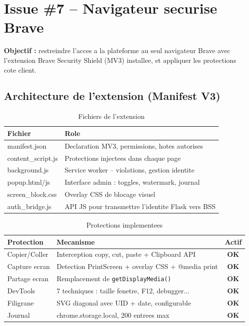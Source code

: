 \documentclass[12pt,a4paper]{article}
\newcommand{\ok}{\textcolor{green!60!black}{\textbf{OK}}}
\begin{document}
\section{Issue \#7 -- Navigateur securise Brave}

\noindent\colorbox{myblue!10}{\parbox{\linewidth}{\vspace{4pt}
\textbf{Objectif :} restreindre l'acces a la plateforme au seul navigateur Brave
avec l'extension Brave Security Shield (MV3) installee, et appliquer les
protections cote client.
\vspace{4pt}}}

\vspace{6pt}

\subsection{Architecture de l'extension (Manifest V3)}

\begin{table}[H]
\centering
\caption{Fichiers de l'extension}
\begin{tabularx}{\textwidth}{@{}>{\ttfamily}lX@{}}
\toprule
\normalfont Fichier & Role \\
\midrule
manifest.json      & Declaration MV3, permissions, hotes autorises \\
content\_script.js & Protections injectees dans chaque page \\
background.js      & Service worker -- violations, gestion identite \\
popup.html/js      & Interface admin : toggles, watermark, journal \\
screen\_block.css  & Overlay CSS de blocage visuel \\
auth\_bridge.js    & API JS pour transmettre l'identite Flask vers BSS \\
\bottomrule
\end{tabularx}
\end{table}

\begin{table}[H]
\centering
\caption{Protections implementees}
\begin{tabularx}{\textwidth}{@{}lXc@{}}
\toprule
Protection & Mecanisme & Actif \\
\midrule
Copier/Coller    & Interception copy, cut, paste + Clipboard API      & \ok \\
Capture ecran    & Detection PrintScreen + overlay CSS + @media print & \ok \\
Partage ecran    & Remplacement de \texttt{getDisplayMedia()}          & \ok \\
DevTools         & 7 techniques : taille fenetre, F12, debugger...     & \ok \\
Filigrane        & SVG diagonal avec UID + date, configurable          & \ok \\
Journal          & chrome.storage.local, 200 entrees max               & \ok \\
\bottomrule
\end{tabularx}
\end{table}
\end{document}

